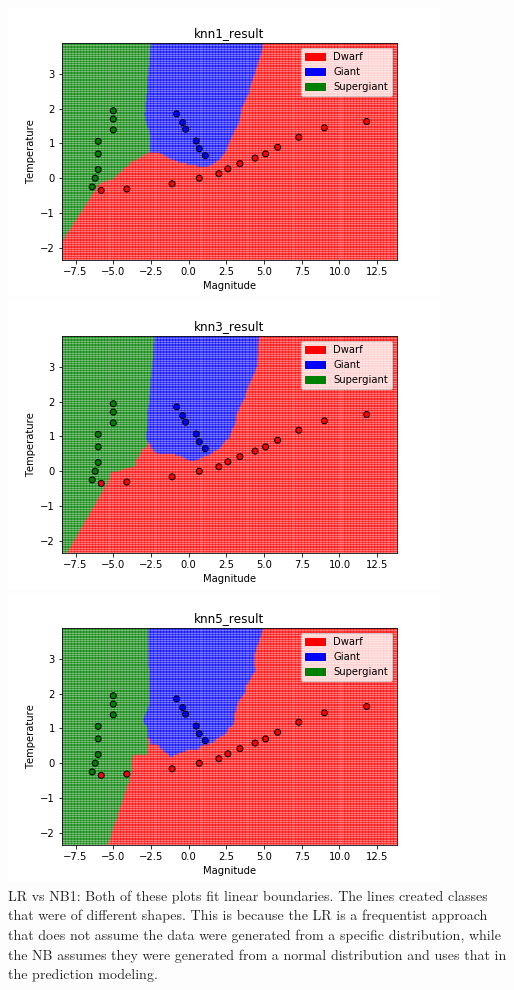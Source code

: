\documentclass[submit]{harvardml}
\begin{document}
\begin{enumerate}
    \includegraphics[scale=0.6]{hw2/knn1_result.png}
    \includegraphics[scale=0.6]{hw2/knn3_result.png}
    \includegraphics[scale=0.6]{hw2/knn5_result.png}\\
    
    LR vs NB1: Both of these plots fit linear boundaries. The lines created classes that were of different shapes. This is because the LR is a frequentist approach that does not assume the data were generated from a specific distribution, while the NB assumes they were generated from a normal distribution and uses that in the prediction modeling. \\
    

\end{enumerate}
\end{document}
